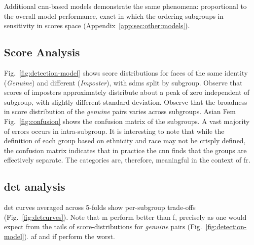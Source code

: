 Additional \gls{cnn}-based models demonstrate the same phenomena: proportional to the overall model performance, exact in which the ordering subgroups in sensitivity in scores space (Appendix~\ref{app:sec:other:models}).






\subsection{Score Analysis}
Fig.~\ref{fig:detection-model} shows score distributions for faces of the same identity (\ie \emph{Genuine}) and different (\ie \emph{Imposter}), with \gls{sdm}s split by subgroup. Observe that scores of imposters  approximately distribute about a peak of zero independent of subgroup, with slightly different standard deviation. Observe that the broadness in score distribution of the \emph{genuine} pairs varies across subgroups. Asian Fem
Fig.~\ref{fig:confusion} shows the confusion matrix of the subgroups. A vast majority of errors occurs in intra-subgroup. It is interesting to note that while the definition of  each group  based on ethnicity and race may not be crisply defined, the confusion matrix indicates that in practice the \gls{cnn} finds that the groups are effectively separate. The categories are, therefore, meaningful in the context of \gls{fr}.


\subsection{\gls{det} analysis}

\gls{det} curves averaged across 5-folds show per-subgroup trade-offs (Fig.~\ref{fig:detcurves}). Note that \gls{m} perform better than \gls{f}, precisely as one would expect from the tails of score-distributions for \emph{genuine} pairs (Fig.~\ref{fig:detection-model}). \Gls{af} and \gls{if} perform the worst.


